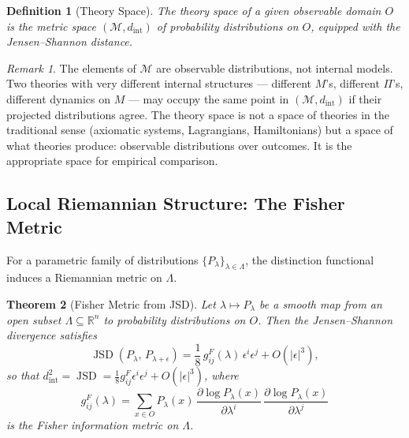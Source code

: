 \documentclass[12pt,a4paper]{article}
\newtheorem{theorem}{Theorem}[section]
\newtheorem{definition}[theorem]{Definition}
\theoremstyle{remark}
\newtheorem{remark}{Remark}[section]
\theoremstyle{definition}
\begin{document}
\begin{definition}[Theory Space]
\label{def:theory_space}
The \emph{theory space} of a given observable domain $O$ is the metric
space $(\mathcal{M}, d_{\mathrm{int}})$ of probability distributions on
$O$, equipped with the Jensen--Shannon distance.
\end{definition}

\begin{remark}
The elements of $\mathcal{M}$ are observable distributions, not internal
models. Two theories with very different internal structures --- different
$M$'s, different $\Pi$'s, different dynamics on $M$ --- may occupy the
same point in $(\mathcal{M}, d_{\mathrm{int}})$ if their projected
distributions agree. The theory space is not a space of theories in the
traditional sense (axiomatic systems, Lagrangians, Hamiltonians) but a
space of what theories produce: observable distributions over outcomes.
It is the appropriate space for empirical comparison.
\end{remark}

\subsection{Local Riemannian Structure: The Fisher Metric}

For a parametric family of distributions $\{P_\lambda\}_{\lambda \in \Lambda}$,
the distinction functional induces a Riemannian metric on $\Lambda$.

\begin{theorem}[Fisher Metric from JSD]
\label{thm:fisher}
Let $\lambda \mapsto P_\lambda$ be a smooth map from an open subset
$\Lambda \subseteq \mathbb{R}^n$ to probability distributions on $O$.
Then the Jensen--Shannon divergence satisfies
\begin{equation}
  \operatorname{JSD}(P_\lambda,\, P_{\lambda+\epsilon})
  = \frac{1}{8}\, g^F_{ij}(\lambda)\,\epsilon^i\epsilon^j
    + O(|\epsilon|^3),
  \label{eq:jsd_fisher}
\end{equation}
so that $d_{\mathrm{int}}^2 = \operatorname{JSD} = \frac{1}{8}g^F_{ij}\epsilon^i\epsilon^j + O(|\epsilon|^3)$,
where
\begin{equation}
  g^F_{ij}(\lambda)
  = \sum_{x \in O} P_\lambda(x)\,
    \frac{\partial \log P_\lambda(x)}{\partial \lambda^i}\,
    \frac{\partial \log P_\lambda(x)}{\partial \lambda^j}
\end{equation}
is the Fisher information metric on $\Lambda$.
\end{theorem}
\end{document}
